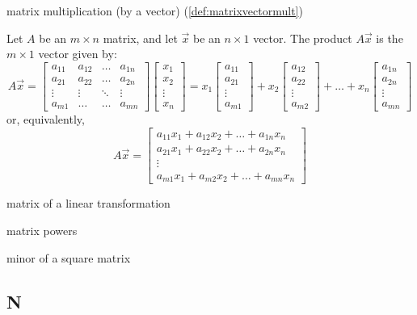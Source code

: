 \documentclass{ximera}
\begin{document}
matrix multiplication (by a vector) (\ref{def:matrixvectormult})
\begin{expandable}
    Let $A$ be an $m\times n$ matrix, and let $\vec{x}$ be an $n\times 1$ vector.  The product $A\vec{x}$ is the $m\times 1$ vector given by:
$$A\vec{x}=\begin{bmatrix}
           a_{11} & a_{12}&\dots&a_{1n}\\
           a_{21}&a_{22} &\dots &a_{2n}\\
		\vdots & \vdots&\ddots &\vdots\\
		a_{m1}&\dots &\dots &a_{mn}
         \end{bmatrix}\begin{bmatrix}x_1\\x_2\\\vdots\\x_n\end{bmatrix}=
         x_1\begin{bmatrix}a_{11}\\a_{21}\\ \vdots \\a_{m1}\end{bmatrix}+
         x_2\begin{bmatrix}a_{12}\\a_{22}\\ \vdots \\a_{m2}\end{bmatrix}+\dots+
         x_n\begin{bmatrix}a_{1n}\\a_{2n}\\ \vdots \\a_{mn}\end{bmatrix}$$
or, equivalently,
$$A\vec{x}=\begin{bmatrix}a_{11}x_1+a_{12}x_2+\ldots +a_{1n}x_n\\a_{21}x_1+a_{22}x_2+\ldots +a_{2n}x_n\\\vdots\\a_{m1}x_1+a_{m2}x_2+\ldots +a_{mn}x_n\end{bmatrix}$$
\end{expandable}

matrix of a linear transformation

matrix powers

minor of a square matrix

\subsection{N}
\end{document}
